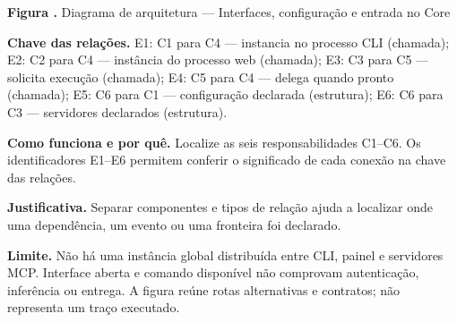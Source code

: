 {\small\textbf{Figura \thefigure.} Diagrama de arquitetura --- Interfaces, configuração e entrada no Core}\par\smallskip
{\footnotesize\textbf{Chave das relações.} E1: C1 para C4 --- instancia no processo CLI (chamada); E2: C2 para C4 --- instância do processo web (chamada); E3: C3 para C5 --- solicita execução (chamada); E4: C5 para C4 --- delega quando pronto (chamada); E5: C6 para C1 --- configuração declarada (estrutura); E6: C6 para C3 --- servidores declarados (estrutura).}\par\smallskip
\noindent\textbf{Como funciona e por quê.} Localize as seis responsabilidades C1--C6. Os identificadores E1--E6 permitem conferir o significado de cada conexão na chave das relações.\par
\noindent\textbf{Justificativa.} Separar componentes e tipos de relação ajuda a localizar onde uma dependência, um evento ou uma fronteira foi declarado.\par
\noindent\textbf{Limite.} Não há uma instância global distribuída entre CLI, painel e servidores MCP. Interface aberta e comando disponível não comprovam autenticação, inferência ou entrega. A figura reúne rotas alternativas e contratos; não representa um traço executado.\par\smallskip
{}
